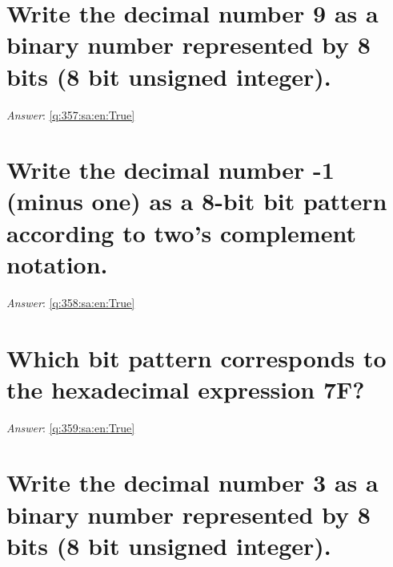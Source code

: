 \documentclass[a4paper,11pt,oneside]{book}
\begin{document}
\begin{sloppypar}
\section{Write the decimal number 9 as a binary number represented by 8 bits (8 bit unsigned integer).}

\label{q:357:sa:en:False}

\vspace{2cm}

\noindent\makebox[\textwidth]{\hrulefill}

\vspace{1cm}

\textit{Answer}: \autoref{q:357:sa:en:True}



\section{Write the decimal number -1 (minus one) as a 8-bit bit pattern according to two{\textquoteright}s complement notation.}

\label{q:358:sa:en:False}

\vspace{2cm}

\noindent\makebox[\textwidth]{\hrulefill}

\vspace{1cm}

\textit{Answer}: \autoref{q:358:sa:en:True}



\section{Which bit pattern corresponds to the hexadecimal expression 7F?}

\label{q:359:sa:en:False}

\vspace{2cm}

\noindent\makebox[\textwidth]{\hrulefill}

\vspace{1cm}

\textit{Answer}: \autoref{q:359:sa:en:True}



\section{Write the decimal number 3 as a binary number represented by 8 bits (8 bit unsigned integer).}


\end{sloppypar}
\end{document}
